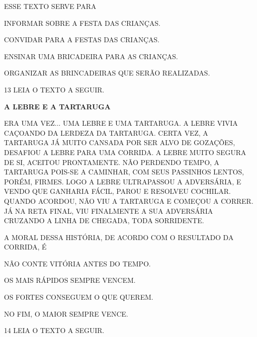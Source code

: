 ESSE TEXTO SERVE PARA

\begin{escolha}

\item INFORMAR SOBRE A FESTA DAS CRIANÇAS.

\item CONVIDAR PARA A FESTAS DAS CRIANÇAS.

\item ENSINAR UMA BRICADEIRA PARA AS CRIANÇAS.

\item ORGANIZAR AS BRINCADEIRAS QUE SERÃO REALIZADAS.

\end{escolha}

\num{13} LEIA O TEXTO A SEGUIR.

\begin{myquote}
\textbf{A LEBRE E A TARTARUGA}

ERA UMA VEZ... UMA LEBRE E UMA TARTARUGA.
A LEBRE VIVIA CAÇOANDO DA LERDEZA DA TARTARUGA.
CERTA VEZ, A TARTARUGA JÁ MUITO CANSADA POR SER ALVO DE GOZAÇÕES, DESAFIOU A LEBRE PARA UMA CORRIDA.
A LEBRE MUITO SEGURA DE SI, ACEITOU PRONTAMENTE.
NÃO PERDENDO TEMPO, A TARTARUGA POIS-SE A CAMINHAR, COM SEUS PASSINHOS LENTOS, PORÉM, FIRMES.
LOGO A LEBRE ULTRAPASSOU A ADVERSÁRIA, E VENDO QUE GANHARIA FÁCIL, PAROU E RESOLVEU COCHILAR.
QUANDO ACORDOU, NÃO VIU A TARTARUGA E COMEÇOU A CORRER.
JÁ NA RETA FINAL, VIU FINALMENTE A SUA ADVERSÁRIA CRUZANDO A LINHA DE CHEGADA, TODA SORRIDENTE.

\end{myquote}

A MORAL DESSA HISTÓRIA, DE ACORDO COM O RESULTADO DA CORRIDA, É

\begin{escolha}

\item NÃO CONTE VITÓRIA ANTES DO TEMPO.

\item OS MAIS RÁPIDOS SEMPRE VENCEM.

\item OS FORTES CONSEGUEM O QUE QUEREM.

\item NO FIM, O MAIOR SEMPRE VENCE.

\end{escolha}

\num{14} LEIA O TEXTO A SEGUIR.

